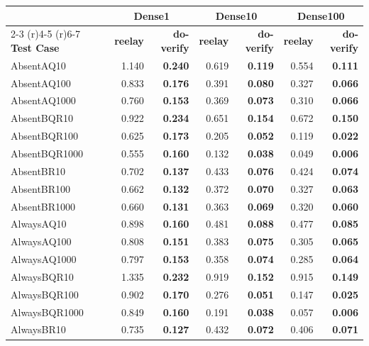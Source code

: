 \documentclass[a4paper,12pt]{report}
\begin{document}
\begin{table}[htbp]
\centering
\footnotesize
\begin{tabular}{lrrrrrr}
\toprule
& \multicolumn{2}{c}{\textbf{Dense1}} & \multicolumn{2}{c}{\textbf{Dense10}} & \multicolumn{2}{c}{\textbf{Dense100}} \\
\cmidrule(r){2-3} \cmidrule(r){4-5} \cmidrule(r){6-7}
\textbf{Test Case} & \textbf{reelay} & \textbf{do-verify} & \textbf{reelay} & \textbf{do-verify} & \textbf{reelay} & \textbf{do-verify} \\
\midrule
AbsentAQ10 & 1.140 & \textbf{0.240} & 0.619 & \textbf{0.119} & 0.554 & \textbf{0.111} \\
AbsentAQ100 & 0.833 & \textbf{0.176} & 0.391 & \textbf{0.080} & 0.327 & \textbf{0.066} \\
AbsentAQ1000 & 0.760 & \textbf{0.153} & 0.369 & \textbf{0.073} & 0.310 & \textbf{0.066} \\
AbsentBQR10 & 0.922 & \textbf{0.234} & 0.651 & \textbf{0.154} & 0.672 & \textbf{0.150} \\
AbsentBQR100 & 0.625 & \textbf{0.173} & 0.205 & \textbf{0.052} & 0.119 & \textbf{0.022} \\
AbsentBQR1000 & 0.555 & \textbf{0.160} & 0.132 & \textbf{0.038} & 0.049 & \textbf{0.006} \\
AbsentBR10 & 0.702 & \textbf{0.137} & 0.433 & \textbf{0.076} & 0.424 & \textbf{0.074} \\
AbsentBR100 & 0.662 & \textbf{0.132} & 0.372 & \textbf{0.070} & 0.327 & \textbf{0.063} \\
AbsentBR1000 & 0.660 & \textbf{0.131} & 0.363 & \textbf{0.069} & 0.320 & \textbf{0.060} \\
AlwaysAQ10 & 0.898 & \textbf{0.160} & 0.481 & \textbf{0.088} & 0.477 & \textbf{0.085} \\
AlwaysAQ100 & 0.808 & \textbf{0.151} & 0.383 & \textbf{0.075} & 0.305 & \textbf{0.065} \\
AlwaysAQ1000 & 0.797 & \textbf{0.153} & 0.358 & \textbf{0.074} & 0.285 & \textbf{0.064} \\
AlwaysBQR10 & 1.335 & \textbf{0.232} & 0.919 & \textbf{0.152} & 0.915 & \textbf{0.149} \\
AlwaysBQR100 & 0.902 & \textbf{0.170} & 0.276 & \textbf{0.051} & 0.147 & \textbf{0.025} \\
AlwaysBQR1000 & 0.849 & \textbf{0.160} & 0.191 & \textbf{0.038} & 0.057 & \textbf{0.006} \\
AlwaysBR10 & 0.735 & \textbf{0.127} & 0.432 & \textbf{0.072} & 0.406 & \textbf{0.071} \\

\end{tabular}
\end{table}
\end{document}
